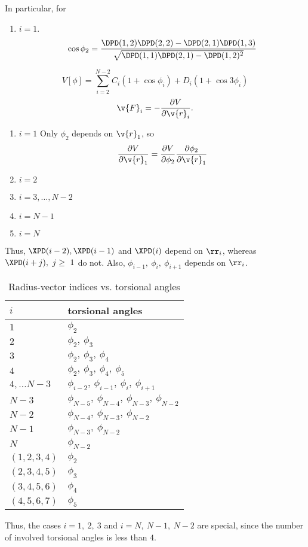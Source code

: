 In particular, for 
\begin{enumerate}
  \item $i=1$. 
    \begin{equation}
      \cos\phi_2=\frac
      {\DPD(1,2)\DPD(2,2)-\DPD(2,1)\DPD(1,3)}
      {\sqrt{\DPD(1,1)\DPD(2,1)-\DPD(1,2)^2}}
    \end{equation}
\end{enumerate}

\begin{equation}
  V[\phi]=\sum_{i=2}^{N-2}C_i(1+\cos{\phi_i})+D_i(1+\cos{3\phi_i})
\end{equation}
\begin{equation}
  \v{F}_i=-\frac{\partial V}{\partial \v{r}_i}.
\end{equation}
\begin{enumerate}
  \item $i=1$ Only $\phi_2$ depends on $\v{r}_1$, so
    \begin{equation}
      \frac{\partial V}{\partial \v{r}_1}=
      {\frac{\partial V}{\partial\phi_2}}
      {\frac{\partial\phi_2}{\partial\v{r}_1}}
    \end{equation}
  \item $i=2$
  \item $i=3,\ldots,N-2$
  \item $i=N-1$
  \item $i=N$
\end{enumerate}

Thus, $\XPD(i-2),\XPD(i-1)$ and $\XPD(i)$ depend on $\rr_i$, 
whereas $\XPD(i+j),\ j\ge\ 1$ do not. 
Also, $\phi_{i-1},\ \phi_i,\ \phi_{i+1}$ depends on $\rr_i$. 
\begin{table}
  \centering
  \caption{Radius-vector indices vs. torsional angles}
  \begin{tabular}{|p{3cm}|p{5cm}|}
\hline
$i$ 	& 	torsional angles \\
\hline
  $1$	&	$\phi_2$ \\
  $2$	&	$\phi_2,\ \phi_3$ \\
  $3$	&	$\phi_2,\ \phi_3,\ \phi_4$ \\
  $4$	&	$\phi_2,\ \phi_3,\ \phi_4,\ \phi_5$ \\
  $4,\ldots N-3$	&	$\phi_{i-2},\ \phi_{i-1},\ \phi_i,\ \phi_{i+1}$ \\
  $N-3$		& $\phi_{N-5},\ \phi_{N-4},\ \phi_{N-3},\ \phi_{N-2}$	\\
  $N-2$		& $\phi_{N-4},\ \phi_{N-3},\ \phi_{N-2}$	\\
  $N-1$		& $\phi_{N-3},\ \phi_{N-2}$			\\
  $N$		& $\phi_{N-2}$		\\
  $(1,2,3,4)$	& $\phi_2$ \\
  $(2,3,4,5)$	& $\phi_3$ \\
  $(3,4,5,6)$	& $\phi_4$ \\
  $(4,5,6,7)$	& $\phi_5$ \\
\hline
  \end{tabular}
\end{table}
Thus, the cases $i=1,\ 2,\ 3$ and $i=N,\ N-1,\ N-2$ are special, since the number
of involved torsional angles is less than $4$. 

